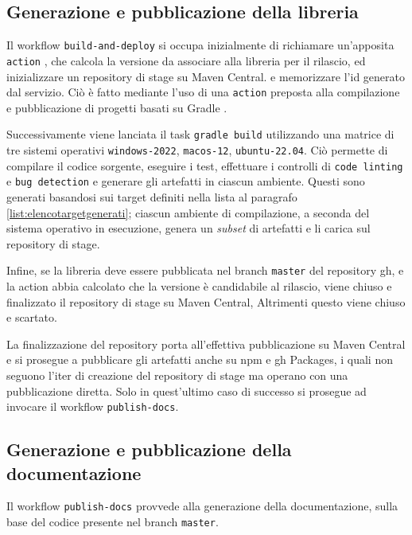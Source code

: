 \documentclass[12pt,a4paper,openright,twoside]{book}
\begin{document}
\subsection{Generazione e pubblicazione della libreria}
Il workflow \texttt{build-and-deploy} si occupa inizialmente di
richiamare un'apposita \texttt{action} \cite{WebsitePrecomputeSemanticReleaseVersionAction}, che calcola la versione da associare
alla libreria per il rilascio, ed inizializzare un repository di stage su Maven Central.
e memorizzare l'id generato dal servizio. Ciò è fatto mediante l'uso di una \texttt{action} preposta alla compilazione e
pubblicazione di progetti basati su Gradle \cite{WebsiteBuildCheckDeployGradleAction}.

Successivamente viene lanciata il task \texttt{gradle build} utilizzando una matrice di tre sistemi operativi
 \texttt{windows-2022}, \texttt{macos-12}, \texttt{ubuntu-22.04}. Ciò permette di compilare il codice sorgente, 
 eseguire i test, effettuare i controlli di \texttt{code linting} e \texttt{bug detection} e generare gli artefatti
 in ciascun ambiente. Questi sono generati basandosi sui target definiti nella lista al paragrafo \ref{list:elencotargetgenerati};
ciascun ambiente di compilazione, a seconda del sistema operativo in esecuzione, genera un \textit{subset} di artefatti e li carica sul repository di stage.

Infine, se la libreria deve essere pubblicata nel branch \texttt{master} del repository \ac{gh}, e la action \cite{WebsitePrecomputeSemanticReleaseVersionAction}
abbia calcolato che la versione è candidabile al rilascio, viene chiuso e finalizzato il repository di stage su Maven Central,
Altrimenti questo viene chiuso e scartato. 

La finalizzazione del repository porta all'effettiva pubblicazione su Maven Central e si prosegue a pubblicare gli artefatti
anche su \ac{npm} e \ac{gh} Packages, i quali non seguono l'iter di creazione del repository di stage ma operano con una pubblicazione diretta.
Solo in quest'ultimo caso di successo si prosegue ad invocare il workflow \texttt{publish-docs}.
\subsection{Generazione e pubblicazione della documentazione}
Il workflow \texttt{publish-docs} provvede alla generazione della documentazione, sulla base del codice presente
nel branch \texttt{master}. 
\end{document}
